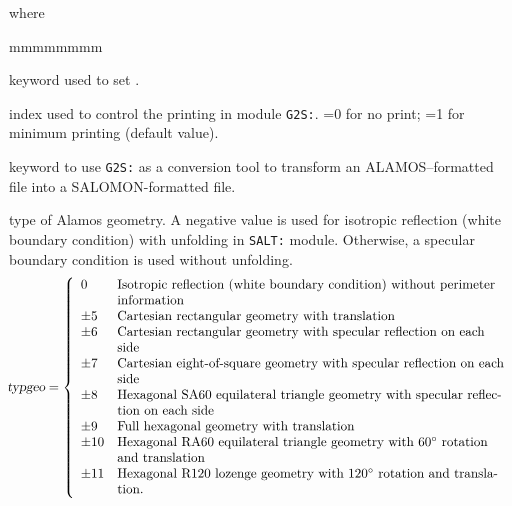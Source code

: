 \noindent where
\begin{ListeDeDescription}{mmmmmmmm}

\item[\moc{EDIT}] keyword used to set .

\item[\dusa{iprint}] index used to control the printing in module {\tt G2S:}. =0 for no print; =1 for minimum printing (default value).

\item[\moc{ALAMOS}] keyword to use {\tt G2S:} as a conversion tool to transform an ALAMOS--formatted file into
a SALOMON-formatted file.

\item[\dusa{typgeo}] type of Alamos geometry. A negative value is used for isotropic reflection (white boundary condition) with unfolding in {\tt SALT:} module.
Otherwise, a specular boundary condition is used without unfolding.
\begin{displaymath}
\negthinspace \textsl{typgeo} = \left\{
\begin{array}{ll}
0 & \textrm{Isotropic reflection (white boundary condition) without perimeter}\\
& \textrm{information}\\
\pm 5 & \textrm{Cartesian rectangular geometry with translation}\\
\pm 6 & \textrm{Cartesian rectangular geometry with specular reflection on each}\\
& \textrm{side}\\
\pm 7 & \textrm{Cartesian eight-of-square geometry with specular reflection on each}\\
& \textrm{side}\\
\pm 8 & \textrm{Hexagonal SA60 equilateral triangle geometry with specular reflec-}\\
& \textrm{tion on each side}\\
\pm 9 & \textrm{Full hexagonal geometry with translation}\\
\pm 10 & \textrm{Hexagonal RA60 equilateral triangle geometry with } 60^\circ \textrm{ rotation}\\
& \textrm{and translation}\\
\pm 11 & \textrm{Hexagonal R120 lozenge geometry with } 120^\circ \textrm{ rotation and transla-}\\
& \textrm{tion.}
\end{array} \right.
\end{displaymath}


\end{ListeDeDescription}
